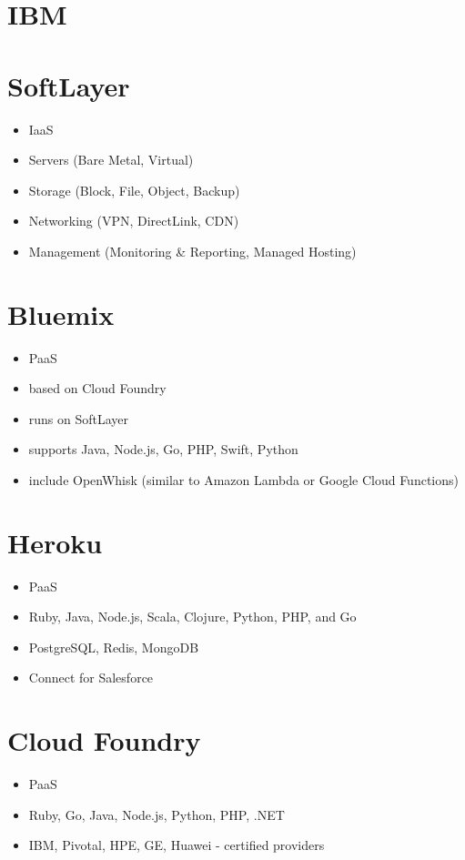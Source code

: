 \documentclass[11pt]{article}
\begin{document}
\section*{IBM}
\label{sec:org79e0469}
\section*{SoftLayer}
\label{sec:orge3be2ae}
\begin{itemize}
\item IaaS
\item Servers (Bare Metal, Virtual)
\item Storage (Block, File, Object, Backup)
\item Networking (VPN, DirectLink, CDN)
\item Management (Monitoring \& Reporting, Managed Hosting)
\end{itemize}
\section*{Bluemix}
\label{sec:orgf3987b6}
\begin{itemize}
\item PaaS
\item based on Cloud Foundry
\item runs on SoftLayer
\item supports Java, Node.js, Go, PHP, Swift, Python
\item include OpenWhisk (similar to Amazon Lambda or Google Cloud Functions)
\end{itemize}
\section*{Heroku}
\label{sec:org1b91267}
\begin{itemize}
\item PaaS
\item Ruby, Java, Node.js, Scala, Clojure, Python, PHP, and Go
\item PostgreSQL, Redis, MongoDB
\item Connect for Salesforce
\end{itemize}
\section*{Cloud Foundry}
\label{sec:org33ab929}
\begin{itemize}
\item PaaS
\item Ruby, Go, Java, Node.js, Python, PHP, .NET
\item IBM, Pivotal, HPE, GE, Huawei - certified providers
\end{itemize}
\end{document}
